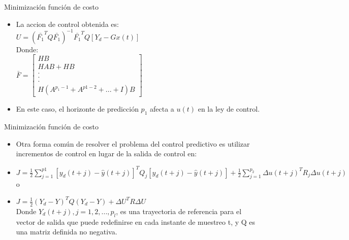 \documentclass{beamer}
\begin{document}
\begin{frame}{Minimización función de costo}
\begin{justify}
\vspace{0.3cm}
\begin{itemize}
\item La accion de control obtenida es:
\\
$U=(\bar{F_1}^TQ\bar{F_1})^{-1}\bar{F_1}^{T}Q[Y_d-Gx(t)]$
\\
\hfill \break
Donde:
\\
\centering
$\bar{F}=
\begin{bmatrix}
    HB \\
    HAB+HB\\
    . \\
    .\\
    .\\
    H(A^{p_1-1}+A^{p1-2}+...+I)B
\end{bmatrix}$
\\
\justifying
\item En este caso, el horizonte de predicción $p_1$ afecta a $u(t)$ en la ley de control.
\end{itemize}
\end{justify}
\end{frame}


\begin{frame}{Minimización función de costo}
\begin{justify}
\vspace{0.3cm}
\begin{itemize}
\item Otra forma común de resolver el problema del control predictivo es utilizar incrementos de control en lugar de la salida de control en:
\\
\hfill \break
\item $J=\frac{1}{2}\sum_{j=1}^{p1}\left [ y_d (t+j)-\hat{y}(t+j)\right ]^TQ_j\left [ y_d(t+j)-\hat{y}(t+j) \right ]+ \frac{1}{2}\sum_{j=1}^{p_2}\Delta u(t+j)^T R_j \Delta u (t+j)$ o
\hfill \break
\item $J=\frac{1}{2}(Y_d-Y)^T Q(Y_d-Y)+\Delta U^TR\Delta U$
\\
\hfill \break
Donde $Y_d(t + j), j = 1,2, ...,p_l$, es una trayectoria de referencia para el vector de salida que puede redefinirse en cada instante de muestreo t, y Q es una matriz definida no negativa.
\end{itemize}
\end{justify}
\end{frame}
\end{document}
